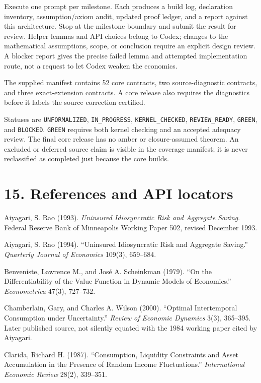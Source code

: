 \documentclass[
  11pt,
]{article}
\begin{document}
Execute one prompt per milestone. Each produces a build log, declaration
inventory, assumption/axiom audit, updated proof ledger, and a report
against this architecture. Stop at the milestone boundary and submit the
result for review. Helper lemmas and API choices belong to Codex;
changes to the mathematical assumptions, scope, or conclusion require an
explicit design review. A blocker report gives the precise failed lemma
and attempted implementation route, not a request to let Codex weaken
the economics.

The supplied manifest contains 52 core contracts, two source-diagnostic
contracts, and three exact-extension contracts. A core release also
requires the diagnostics before it labels the source correction
certified.

Statuses are \texttt{UNFORMALIZED}, \texttt{IN\_PROGRESS},
\texttt{KERNEL\_CHECKED}, \texttt{REVIEW\_READY}, \texttt{GREEN}, and
\texttt{BLOCKED}. \texttt{GREEN} requires both kernel checking and an
accepted adequacy review. The final core release has no amber or
closure-assumed theorem. An excluded or deferred source claim is visible
in the coverage manifest; it is never reclassified as completed just
because the core builds.

\section{15. References and API
locators}\label{references-and-api-locators}

Aiyagari, S. Rao (1993). \emph{Uninsured Idiosyncratic Risk and
Aggregate Saving}. Federal Reserve Bank of Minneapolis Working Paper
502, revised December 1993.

Aiyagari, S. Rao (1994). ``Uninsured Idiosyncratic Risk and Aggregate
Saving.'' \emph{Quarterly Journal of Economics} 109(3), 659--684.

Benveniste, Lawrence M., and José A. Scheinkman (1979). ``On the
Differentiability of the Value Function in Dynamic Models of
Economics.'' \emph{Econometrica} 47(3), 727--732.

Chamberlain, Gary, and Charles A. Wilson (2000). ``Optimal Intertemporal
Consumption under Uncertainty.'' \emph{Review of Economic Dynamics}
3(3), 365--395. Later published source, not silently equated with the
1984 working paper cited by Aiyagari.

Clarida, Richard H. (1987). ``Consumption, Liquidity Constraints and
Asset Accumulation in the Presence of Random Income Fluctuations.''
\emph{International Economic Review} 28(2), 339--351.
\end{document}
